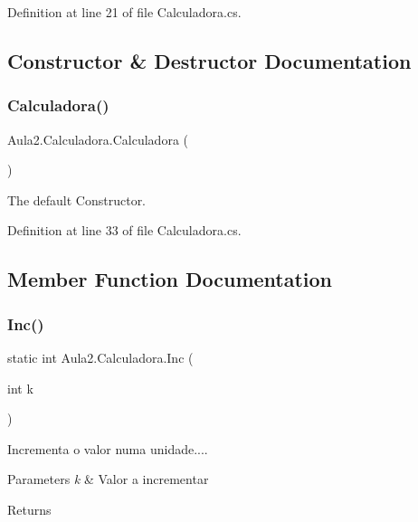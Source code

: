 Definition at line 21 of file Calculadora.\+cs.



\subsection{Constructor \& Destructor Documentation}
\mbox{\label{class_aula2_1_1_calculadora_a6d6cfb4679e09d5d6592bd40b879e3e2}} 
\subsubsection{\texorpdfstring{Calculadora()}{Calculadora()}}
{\footnotesize\ttfamily Aula2.\+Calculadora.\+Calculadora (\begin{DoxyParamCaption}{ }\end{DoxyParamCaption})}



The default Constructor. 



Definition at line 33 of file Calculadora.\+cs.



\subsection{Member Function Documentation}
\mbox{\label{class_aula2_1_1_calculadora_a752665de1ce52fd3ad3b1d6b23d7801c}} 
\subsubsection{\texorpdfstring{Inc()}{Inc()}}
{\footnotesize\ttfamily static int Aula2.\+Calculadora.\+Inc (\begin{DoxyParamCaption}\item[{int}]{k }\end{DoxyParamCaption})\hspace{0.3cm}{\ttfamily [static]}}



Incrementa o valor numa unidade.... 


\begin{DoxyParams}{Parameters}
{\em k} & Valor a incrementar\\
\hline
\end{DoxyParams}
\begin{DoxyReturn}{Returns}

\end{DoxyReturn}


